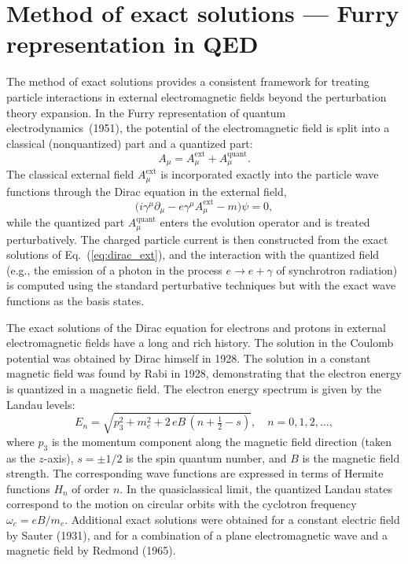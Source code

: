 \documentclass[a4paper,11pt]{article}
\begin{document}

\section{Method of exact solutions --- Furry representation in QED}
\label{sec:furry}

The method of exact solutions provides a consistent framework for treating particle interactions in external electromagnetic fields beyond the perturbation theory expansion. In the Furry representation of quantum electrodynamics~(1951), the potential of the electromagnetic field is split into a classical (nonquantized) part and a quantized part:
\begin{equation}
\label{eq:A_split}
A_\mu = A_\mu^{\text{ext}} + A_\mu^{\text{quant}}.
\end{equation}
The classical external field $A_\mu^{\text{ext}}$ is incorporated exactly into the particle wave functions through the Dirac equation in the external field,
\begin{equation}
\label{eq:dirac_ext}
\Big(i\gamma^\mu \partial_\mu - e\gamma^\mu A_\mu^{\text{ext}} - m\Big)\psi = 0,
\end{equation}
while the quantized part $A_\mu^{\text{quant}}$ enters the evolution operator and is treated perturbatively. The charged particle current is then constructed from the exact solutions of Eq.~(\ref{eq:dirac_ext}), and the interaction with the quantized field (e.g., the emission of a photon in the process $e \to e + \gamma$ of synchrotron radiation) is computed using the standard perturbative techniques but with the exact wave functions as the basis states.

The exact solutions of the Dirac equation for electrons and protons in external electromagnetic fields have a long and rich history. The solution in the Coulomb potential was obtained by Dirac himself in 1928. The solution in a constant magnetic field was found by Rabi in 1928, demonstrating that the electron energy is quantized in a magnetic field. The electron energy spectrum is given by the Landau levels:
\begin{equation}
\label{eq:landau}
E_n = \sqrt{p_3^2 + m_e^2 + 2\,e B\,(n + \tfrac{1}{2} - s)}, \quad n = 0, 1, 2, \ldots,
\end{equation}
where $p_3$ is the momentum component along the magnetic field direction (taken as the $z$-axis), $s = \pm 1/2$ is the spin quantum number, and $B$ is the magnetic field strength. The corresponding wave functions are expressed in terms of Hermite functions $H_n$ of order $n$. In the quasiclassical limit, the quantized Landau states correspond to the motion on circular orbits with the cyclotron frequency $\omega_c = eB/m_e$. Additional exact solutions were obtained for a constant electric field by Sauter (1931), and for a combination of a plane electromagnetic wave and a magnetic field by Redmond (1965).
\end{document}
